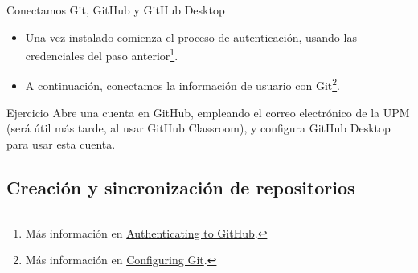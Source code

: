 \documentclass[xcolor={usenames,svgnames,dvipsnames}]{beamer}
\begin{document}
\begin{frame}[label={sec:org9df3c20}]{Conectamos Git, GitHub y GitHub Desktop}
\begin{itemize}
\item Una vez instalado comienza el proceso de autenticación, usando las credenciales del paso anterior\footnote{Más información en \href{https://help.github.com/desktop/guides/getting-started-with-github-desktop/authenticating-to-github/}{Authenticating to GitHub}.}.
\end{itemize}

\begin{center}
\end{center}


\begin{itemize}
\item A continuación, conectamos la información de usuario con Git\footnote{Más información en \href{https://help.github.com/desktop/guides/getting-started-with-github-desktop/configuring-git-for-github-desktop/}{Configuring Git}.}.
\end{itemize}

\begin{center}
\end{center}
\end{frame}

\begin{frame}[label={sec:org978767b}]{}
\begin{block}{Ejercicio}
Abre una cuenta en GitHub, empleando el correo electrónico de la UPM (será útil más tarde, al usar GitHub Classroom), y configura GitHub Desktop para usar esta cuenta.
\end{block}
\end{frame}

\subsection{Creación y sincronización de repositorios}
\label{sec:org6328a2d}
\end{document}
